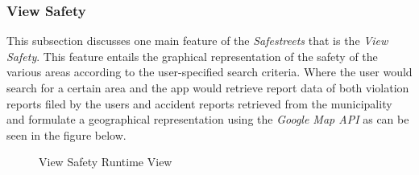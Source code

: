 \subsubsection{View Safety}
This subsection discusses one main feature of the \emph{Safestreets} that is the \emph{View Safety}. This feature entails the graphical representation of the safety of the various areas according to the user-specified search criteria. Where the user would search for a certain area and the app would retrieve report data of both violation reports filed by the users and accident reports retrieved from the municipality and formulate a geographical representation using the \emph{Google Map API} as can be seen in the figure below.
\begin{sidewaysfigure}
\begin{figure}[H]
\caption{View Safety Runtime View}
\label{fig:RuntimeSafe}
\centering

\end{figure}
\end{sidewaysfigure}